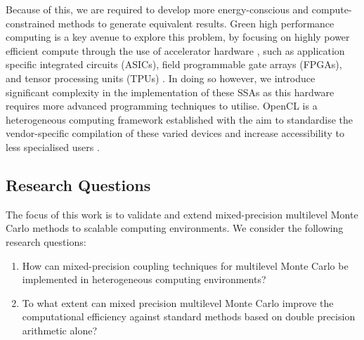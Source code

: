 Because of this, we are required to develop more energy-conscious and compute-constrained methods to generate equivalent results. Green high performance computing is a key avenue to explore this problem, by focusing on highly power efficient compute through the use of accelerator hardware \cite{brightwellChallengesHighPerformanceNetworking2010, rostirollaGreenHPCNovelFramework2015}, such as application specific integrated circuits (ASICs), field programmable gate arrays (FPGAs), and tensor processing units (TPUs) \cite{brightwellChallengesHighPerformanceNetworking2010}. In doing so however, we introduce significant complexity in the implementation of these SSAs as this hardware requires more advanced programming techniques to utilise. OpenCL is a heterogeneous computing framework established with the aim to standardise the vendor-specific compilation of these varied devices and increase accessibility to less specialised users \cite{warnePulsecoupledNeuralNetwork2014, warneComparisonHighLevel2014}. 

\subsection{Research Questions}
The focus of this work is to validate and extend mixed-precision multilevel Monte Carlo methods to scalable computing environments. We consider the following research questions: 

\begin{enumerate}
    \item How can mixed-precision coupling techniques for multilevel Monte Carlo be implemented in heterogeneous computing environments?
    \item To what extent can mixed precision multilevel Monte Carlo improve the computational efficiency against standard methods based on double precision arithmetic alone?
\end{enumerate}

